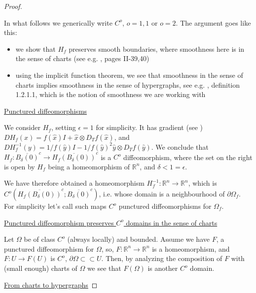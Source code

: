 \documentclass[english,a4paper,10pt,oneside]{scrbook}	%
\theoremstyle{break}
\newenvironment{mproof}[1][\proofname]{%
  \begin{proof}[#1]$ $\par\nobreak\ignorespaces
}{%
  \end{proof}
}
\renewcommand*{\proofname}{Proof}
\theoremstyle{remark}
\newcommand{\mR}{\mathbb{R}}
\newcommand{\cc}{\subset\subset}
\newcommand{\xh}{\hat{x}}
\newcommand{\yh}{\hat{y}}
\newcommand{\eps}{\epsilon}
\begin{document}
\begin{mproof}

In what follows we generically write $ C^o$, $o=1,1 $ or $o=2$. The argument goes like this:

\begin{itemize}
	\item we show that $H_f$ preserves smooth boundaries, where smoothness here is in the sense of charts (see e.g. \cite{murat}, pages II-39,40)
	\item using the implicit function theorem, we see that smoothness in the sense of charts implies smoothness in the sense of hypergraphs, see e.g. \cite{grisvard}, definition 1.2.1.1, which is the notion of smoothness we are working with  
\end{itemize}


\underline{Punctured diffeomorphisms}

We consider $H_f$, setting $\eps=1$ for simplicity. It has gradient (see \cite{deckelnick}) $D H_f(x) = f(\xh)I+\xh \otimes D_Tf(\xh)$, and  $D H_f^{-1}(y) =1/f(\yh)I-1/f(\yh)^2 \yh \otimes D_Tf(\yh)$. We conclude that $H_f: \overline{B_\delta(0)}^c \rightarrow \overline{H_f(B_\delta(0))}^c$ is a $C^o$ diffeomorphism, where the set on the right is open by $H_f$ being a homeomorphism of $\mR^n$, and $\delta < 1 = \eps$.

We have therefore obtained a homeomorphism $H_f^{-1}:\mR^n \rightarrow \mR^n$, which is $C^o( \overline{H_f(B_\delta(0))}^c;\overline{B_\delta(0)}^c )$, i.e. whose domain is a neighbourhood of $\partial \Omega_f$.
For simplicity let's call such maps $C^o$ punctured diffeomorphisms for $\Omega_f$.

\underline{Punctured diffeomorphism preserves $C^o$ domains in the sense of charts}

Let $\Omega$ be of class $C^o$ (always locally) and bounded. Assume we have $F$, a punctured diffeomorphism for $\Omega$, so, $F:\mR^n\rightarrow \mR^n$ is a homeomorphism, and $F: U\rightarrow F(U)$ is $C^o$, $\partial \Omega \cc U$. Then, by analyzing the composition of $F$ with (small enough) charts of $\Omega$ we see that $F(\Omega)$ is another $C^o$ domain. 

\underline{From charts to hypergraphs}


\end{mproof}
\end{document}
